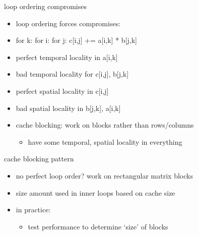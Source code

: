 \begin{frame}{loop ordering compromises}
    \begin{itemize}
    \item loop ordering forces compromises:
    \item for k: for i: for j: c[i,j] += a[i,k] * b[j,k]
    \vspace{.5cm}
    \item perfect temporal locality in a[i,k]
    \item bad temporal locality for c[i,j], b[j,k]
    \item perfect spatial locality in c[i,j]
    \item bad spatial locality  in b[j,k], a[i,k]
    \vspace{.5cm}
    \item<2-> cache blocking: work on blocks rather than rows/columns
        \begin{itemize}
        \item have some temporal, spatial locality in everything
        \end{itemize}
    \end{itemize}
\end{frame}

\begin{frame}{cache blocking pattern}
    \begin{itemize}
    \item no perfect loop order? work on rectangular matrix blocks
    \vspace{.5cm}
    \item size amount used in inner loops based on cache size
    \item in practice:
        \begin{itemize}
        \item test performance to determine `size' of blocks
        \end{itemize}
    \end{itemize}
\end{frame}
